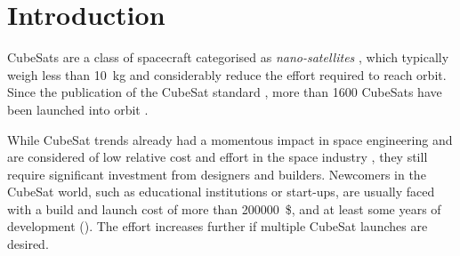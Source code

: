 \documentclass[]{iac}
\begin{document}
\maketitle

\acuseall
\printacronyms[template=supertabular]





\section{Introduction}

    CubeSats are a class of spacecraft categorised as \emph{nano-satellites} \autocite{kulu_nanosats_2021}, which typically weigh less than \SI{10}{\kilo\gram} and considerably reduce the effort required to reach orbit.
    Since the publication of the CubeSat standard \cite{CDS14}, more than 1600 CubeSats have been launched into orbit \autocite{kulu_nanosats_2021}.

    

 
    
    While CubeSat trends already had a momentous impact in space engineering and are considered of low relative cost and effort in the space industry \autocite{poghosyan_cubesat_2017, sweeting_modern_2018}, they still require significant investment from designers and builders. Newcomers in the CubeSat world, such as educational institutions or start-ups, are usually faced with a build and launch cost of more than \SI{200000}{\$}, and at least some years of development (). The effort increases further if multiple CubeSat launches are desired.
\end{document}

